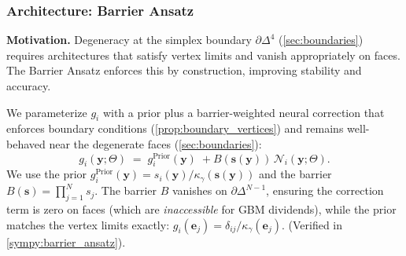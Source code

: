 \documentclass[11pt,letterpaper,oneside]{article}
\numberwithin{equation}{section}
\newcommand{\1}{\mathbf{1}}
\begin{document}
\subsubsection{Architecture: Barrier Ansatz}

\begin{tcolorbox}[didacticstyle]
	\textbf{Motivation.} Degeneracy at the simplex boundary $\partial\Delta^{4}$ (\cref{sec:boundaries}) requires architectures that satisfy vertex limits and vanish appropriately on faces. The Barrier Ansatz enforces this by construction, improving stability and accuracy.
\end{tcolorbox}

\begin{tcolorbox}[mathstyle,title={Barrier Ansatz Architecture (prior corrected)}]
We parameterize $g_i$ with a prior plus a barrier-weighted neural correction that enforces boundary conditions (\cref{prop:boundary_vertices}) and remains well-behaved near the degenerate faces (\cref{sec:boundaries}):
\begin{equation}\label{eq:barrier_ansatz}
  g_i(\bm{y};\Theta) \;=\; g_i^{\text{Prior}}(\bm{y}) \;+
  B(\bm{s}(\bm{y}))\, \mathcal{N}_i(\bm{y};\Theta).
\end{equation}
We use the prior $g_i^{\text{Prior}}(\bm{y}) = s_i(\bm{y})/\kappa_\gamma(\bm{s}(\bm{y}))$ and the barrier $B(\bm{s}) = \prod_{j=1}^N s_j$.
The barrier $B$ vanishes on $\partial\Delta^{N-1}$, ensuring the correction term is zero on faces (which are \emph{inaccessible} for GBM dividends), while the prior matches the vertex limits exactly: $g_i(\bm{e}_j)=\delta_{ij}/\kappa_\gamma(\bm{e}_j)$. (Verified in \cref{sympy:barrier_ansatz}).
\end{tcolorbox}
\end{document}
